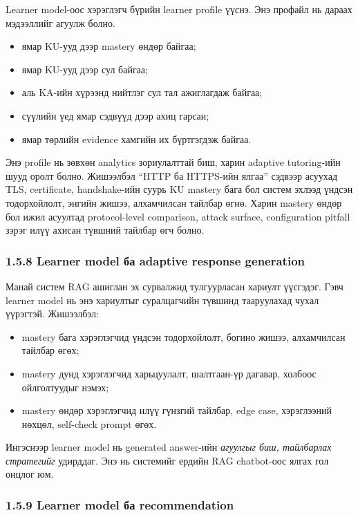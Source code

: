 \documentclass[12pt,A4]{report}
\begin{document}
Learner model-оос хэрэглэгч бүрийн learner profile үүснэ. Энэ профайл нь дараах мэдээллийг агуулж болно.

\begin{itemize}
    \item ямар KU-ууд дээр mastery өндөр байгаа;
    \item ямар KU-ууд дээр сул байгаа;
    \item аль KA-ийн хүрээнд нийтлэг сул тал ажиглагдаж байгаа;
    \item сүүлийн үед ямар сэдвүүд дээр ахиц гарсан;
    \item ямар төрлийн evidence хамгийн их бүртгэгдэж байгаа.
\end{itemize}

Энэ profile нь зөвхөн analytics зориулалттай биш, харин adaptive tutoring-ийн шууд оролт болно. Жишээлбэл ``HTTP ба HTTPS-ийн ялгаа'' сэдвээр асуухад TLS, certificate, handshake-ийн суурь KU mastery бага бол систем эхлээд үндсэн тодорхойлолт, энгийн жишээ, алхамчилсан тайлбар өгнө. Харин mastery өндөр бол ижил асуултад protocol-level comparison, attack surface, configuration pitfall зэрэг илүү ахисан түвшний тайлбар өгч болно.

\subsubsection{1.5.8 Learner model ба adaptive response generation}

Манай систем RAG ашиглан эх сурвалжид тулгуурласан хариулт үүсгэдэг. Гэвч learner model нь энэ хариултыг суралцагчийн түвшинд тааруулахад чухал үүрэгтэй. Жишээлбэл:

\begin{itemize}
    \item mastery бага хэрэглэгчид үндсэн тодорхойлолт, богино жишээ, алхамчилсан тайлбар өгөх;
    \item mastery дунд хэрэглэгчид харьцуулалт, шалтгаан-үр дагавар, холбоос ойлголтуудыг нэмэх;
    \item mastery өндөр хэрэглэгчид илүү гүнзгий тайлбар, edge case, хэрэглээний нөхцөл, self-check prompt өгөх.
\end{itemize}

Ингэснээр learner model нь generated answer-ийн \emph{агуулгыг биш, тайлбарлах стратегийг} удирддаг. Энэ нь системийг ердийн RAG chatbot-оос ялгах гол онцлог юм.

\subsubsection{1.5.9 Learner model ба recommendation}
\end{document}
